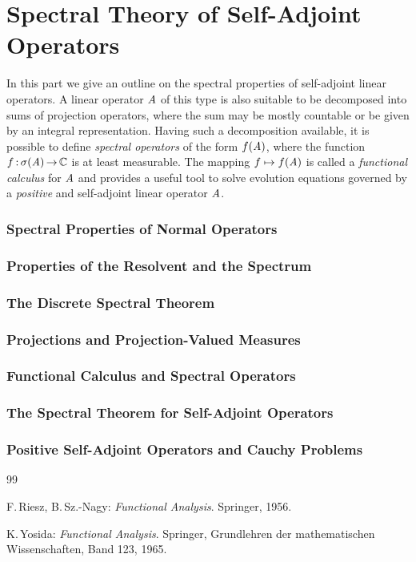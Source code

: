 \documentclass[11pt,twoside]{article}
\begin{document}
\part{Spectral Theory of Self-Adjoint Operators}                               %
In this part we give an outline on the spectral properties of self-adjoint
linear operators.
A linear operator $\mathit{A}$ of this type is also suitable to be decomposed
into sums of projection operators,
where the sum may be mostly countable or be given by an integral representation.
Having such a decomposition available,
it is possible to define \textit{spectral operators} of the form $f(\mathit{A})$,
where the function $f{\,:\,}\sigma(\mathit{A}) {\,\to\,} {\mathbb{C}}$ is at least measurable.
The mapping $f \mapsto f(\mathit{A})$ is called a \textit{functional calculus}
for $\mathit{A}$ and provides a useful tool to solve evolution equations
governed by a \textit{positive} and self-adjoint linear operator $\mathit{A}$.

\section{Spectral Properties of Normal Operators}
\section{Properties of the Resolvent and the Spectrum}
\section{The Discrete Spectral Theorem}
\section{Projections and Projection-Valued Measures}
\section{Functional Calculus and Spectral Operators}
\section{The Spectral Theorem for Self-Adjoint Operators}
\section{Positive Self-Adjoint Operators and Cauchy Problems}

\vspace{5mm}
\begin{thebibliography}{99}
\begin{small}

 F.\,Riesz, B.\,Sz.-Nagy:
\textit{{Functional Analysis}}.
Springer, 1956.

 K.\,Yosida:
\textit{Functional Analysis}.
Springer, Grund\-lehren der mathematischen Wissenschaften, Band 123, 1965.

\end{small}
\end{thebibliography}
\end{document}
